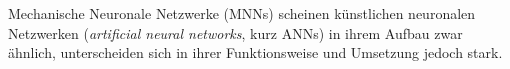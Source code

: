 \documentclass[10pt]{scrartcl}
\newcommand*{\eng}[1]{\textit{#1}}
\begin{document}
Mechanische Neuronale Netzwerke (MNNs) scheinen künstlichen neuronalen Netzwerken (\eng{artificial neural networks}, kurz ANNs) in ihrem Aufbau zwar ähnlich,
unterscheiden sich in ihrer Funktionsweise und Umsetzung jedoch stark.

    
        
\end{document}
